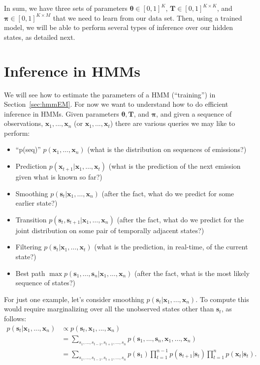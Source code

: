 In sum, we have three sets of parameters $\boldsymbol{\theta} \in [0,1]^{K}$, $\textbf{T} \in [0,1]^{K \times K}$, and $\boldsymbol{\pi} \in [0,1]^{K \times M}$ that we need to learn from our data set.
Then, using a trained model, we will be able to perform several types of inference over our hidden states, as detailed next.

\section{Inference in HMMs}


We will see how to estimate the parameters of a HMM (``training'') in Section~\ref{sec:hmmEM}. For now we want to understand how to do efficient inference in HMMs. Given parameters $\boldsymbol{\theta}, \textbf{T}$, and $\boldsymbol{\pi}$, and given a sequence of observations, $\textbf{x}_1, ..., \textbf{x}_n$ (or $\textbf{x}_1, ..., \textbf{x}_t$) there are various queries we may like to perform:
%
\begin{itemize}
	\item ``p(seq)'' $p(\mathbf{x}_1,\ldots,\mathbf{x}_n)$  (what is the distribution on sequences of emissions?)
	\item Prediction $p(\mathbf{x}_{t+1}|\mathbf{x}_1,\ldots,\mathbf{x}_t)$ (what is the prediction of the next emission given what is known so far?)
	\item Smoothing $p(\mathbf{s}_t|\mathbf{x}_1,\ldots,\mathbf{x}_n)$ (after the fact, what do we predict for some earlier state?)
	\item Transition $p(\mathbf{s}_t,\mathbf{s}_{t+1}|\mathbf{x}_1,\ldots,\mathbf{x}_n)$ (after the fact, what do we predict for the joint distribution on some pair of temporally adjacent states?)
        \item Filtering $p(\mathbf{s}_t|\mathbf{x}_1,\ldots,\mathbf{x}_t)$ (what is the prediction, in real-time, of the current state?)
          \item Best path $\max p(\mathbf{s}_1,\ldots,\mathbf{s}_n|\mathbf{x}_1,\ldots,\mathbf{x}_n)$ (after the fact, what is the most likely sequence of states?)
\end{itemize}

For just one example, let's consider smoothing $p(\textbf{s}_t | \textbf{x}_1, ..., \textbf{x}_n)$. To
compute this 
would require marginalizing over all the unobserved states other than $\textbf{s}_{t}$, as follows:
\begin{align*}
  p(\textbf{s}_t |\textbf{x}_1, ..., \textbf{x}_n) &\propto p(\textbf{s}_t, \textbf{x}_1, ..., \textbf{x}_n)\\
                                                   &=\sum_{s_1,\ldots,s_{t-1},s_{t+1},\ldots,s_n} p(\textbf{s}_1, \ldots, \textbf{s}_n, \textbf{x}_1, \ldots, \textbf{x}_n)
  \\
                                                   &=\sum_{s_1,\ldots,s_{t-1},s_{t+1},\ldots,s_n}p(\textbf{s}_1) \prod_{t=1}^{n-1} p(\textbf{s}_{t+1} | \textbf{s}_t) \prod_{t=1}^{n} p(\textbf{x}_t | \textbf{s}_t).
\end{align*}

